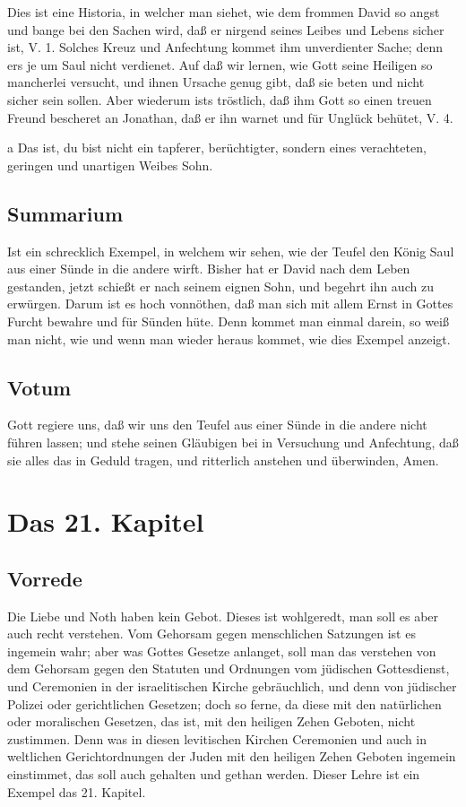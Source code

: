 Dies ist eine Historia, in welcher man siehet, wie dem frommen David so angst und bange bei den Sachen wird, daß er nirgend seines Leibes und Lebens sicher ist, V. 1. Solches Kreuz und Anfechtung kommet ihm unverdienter Sache; denn ers je um Saul nicht verdienet. Auf daß wir lernen, wie Gott seine Heiligen so mancherlei versucht, und ihnen Ursache genug gibt, daß sie beten und nicht sicher sein sollen. Aber wiederum ists tröstlich, daß ihm Gott so einen treuen Freund bescheret an Jonathan, daß er ihn warnet und für Unglück behütet, V. 4.

a Das ist, du bist nicht ein tapferer, berüchtigter, sondern eines verachteten, geringen und unartigen Weibes Sohn.

\section{Summarium}

Ist ein schrecklich Exempel, in welchem wir sehen, wie der Teufel den König Saul aus einer Sünde in die andere wirft. Bisher hat er David nach dem Leben gestanden, jetzt schießt er nach seinem eignen Sohn, und begehrt ihn auch zu erwürgen. Darum ist es hoch vonnöthen, daß man sich mit allem Ernst in Gottes Furcht bewahre und für Sünden hüte. Denn kommet man einmal darein, so weiß man nicht, wie und wenn man wieder heraus kommet, wie dies Exempel anzeigt.

\section{Votum}

Gott regiere uns, daß wir uns den Teufel aus einer Sünde in die andere nicht führen lassen; und stehe seinen Gläubigen bei in Versuchung und Anfechtung, daß sie alles das in Geduld tragen, und ritterlich anstehen und überwinden, Amen.

\chapter{Das 21. Kapitel}

\section{Vorrede}

Die Liebe und Noth haben kein Gebot. Dieses ist wohlgeredt, man soll es aber auch recht verstehen. Vom Gehorsam gegen menschlichen Satzungen ist es ingemein wahr; aber was Gottes Gesetze anlanget, soll man das verstehen von dem Gehorsam gegen den Statuten und Ordnungen vom jüdischen Gottesdienst, und Ceremonien in der israelitischen Kirche gebräuchlich, und denn von jüdischer Polizei oder gerichtlichen Gesetzen; doch so ferne, da diese mit den natürlichen oder moralischen Gesetzen, das ist, mit den heiligen Zehen Geboten, nicht zustimmen. Denn was in diesen levitischen Kirchen Ceremonien und auch in weltlichen Gerichtordnungen der Juden mit den heiligen Zehen Geboten ingemein einstimmet, das soll auch gehalten und gethan werden. Dieser Lehre ist ein Exempel das 21. Kapitel.

